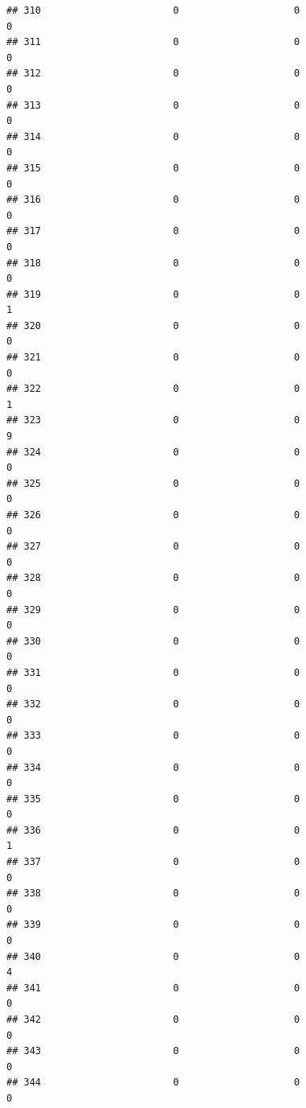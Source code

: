 \documentclass[
]{article}
\begin{document}
\begin{verbatim}
## 310                       0                    0                      0
## 311                       0                    0                      0
## 312                       0                    0                      0
## 313                       0                    0                      0
## 314                       0                    0                      0
## 315                       0                    0                      0
## 316                       0                    0                      0
## 317                       0                    0                      0
## 318                       0                    0                      0
## 319                       0                    0                      1
## 320                       0                    0                      0
## 321                       0                    0                      0
## 322                       0                    0                      1
## 323                       0                    0                      9
## 324                       0                    0                      0
## 325                       0                    0                      0
## 326                       0                    0                      0
## 327                       0                    0                      0
## 328                       0                    0                      0
## 329                       0                    0                      0
## 330                       0                    0                      0
## 331                       0                    0                      0
## 332                       0                    0                      0
## 333                       0                    0                      0
## 334                       0                    0                      0
## 335                       0                    0                      0
## 336                       0                    0                      1
## 337                       0                    0                      0
## 338                       0                    0                      0
## 339                       0                    0                      0
## 340                       0                    0                      4
## 341                       0                    0                      0
## 342                       0                    0                      0
## 343                       0                    0                      0
## 344                       0                    0                      0

\end{verbatim}
\end{document}
